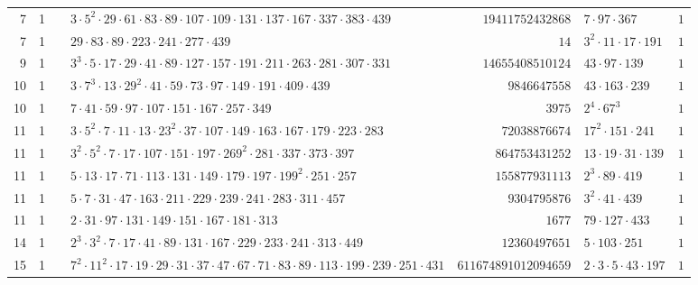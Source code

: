 \documentclass[a4paper,twoside,10pt]{report}
\renewcommand{\checkmark}{\text{\ding{51}}}
\newcommand{\cross}{\text{\ding{55}}}
\begin{document}
\begin{longtable}{rrcp{5cm}rp{5cm}r}
7 & 1 & \checkmark& $3 \cdot 5^{2} \cdot 29 \cdot 61 \cdot 83 \cdot 89 \cdot 107 \cdot 109 \cdot 131 \cdot 137 \cdot 167 \cdot 337 \cdot 383 \cdot 439$ & $19411752432868$ & $7 \cdot 97 \cdot 367$ & $1$\\
7 & 1 & \cross& $29 \cdot 83 \cdot 89 \cdot 223 \cdot 241 \cdot 277 \cdot 439$ & $14$ & $3^{2} \cdot 11 \cdot 17 \cdot 191$ & $1$\\
9 & 1 & \checkmark& $3^{3} \cdot 5 \cdot 17 \cdot 29 \cdot 41 \cdot 89 \cdot 127 \cdot 157 \cdot 191 \cdot 211 \cdot 263 \cdot 281 \cdot 307 \cdot 331$ & $14655408510124$ & $43 \cdot 97 \cdot 139$ & $1$\\
10 & 1 & \checkmark& $3 \cdot 7^{3} \cdot 13 \cdot 29^{2} \cdot 41 \cdot 59 \cdot 73 \cdot 97 \cdot 149 \cdot 191 \cdot 409 \cdot 439$ & $9846647558$ & $43 \cdot 163 \cdot 239$ & $1$\\
10 & 1 & \cross& $7 \cdot 41 \cdot 59 \cdot 97 \cdot 107 \cdot 151 \cdot 167 \cdot 257 \cdot 349$ & $3975$ & $2^{4} \cdot 67^{3}$ & $1$\\
11 & 1 & \checkmark& $3 \cdot 5^{2} \cdot 7 \cdot 11 \cdot 13 \cdot 23^{2} \cdot 37 \cdot 107 \cdot 149 \cdot 163 \cdot 167 \cdot 179 \cdot 223 \cdot 283$ & $72038876674$ & $17^{2} \cdot 151 \cdot 241$ & $1$\\
11 & 1 & \checkmark& $3^{2} \cdot 5^{2} \cdot 7 \cdot 17 \cdot 107 \cdot 151 \cdot 197 \cdot 269^{2} \cdot 281 \cdot 337 \cdot 373 \cdot 397$ & $864753431252$ & $13 \cdot 19 \cdot 31 \cdot 139$ & $1$\\
11 & 1 & \checkmark& $5 \cdot 13 \cdot 17 \cdot 71 \cdot 113 \cdot 131 \cdot 149 \cdot 179 \cdot 197 \cdot 199^{2} \cdot 251 \cdot 257$ & $155877931113$ & $2^{3} \cdot 89 \cdot 419$ & $1$\\
11 & 1 & \checkmark& $5 \cdot 7 \cdot 31 \cdot 47 \cdot 163 \cdot 211 \cdot 229 \cdot 239 \cdot 241 \cdot 283 \cdot 311 \cdot 457$ & $9304795876$ & $3^{2} \cdot 41 \cdot 439$ & $1$\\
11 & 1 & \cross& $2 \cdot 31 \cdot 97 \cdot 131 \cdot 149 \cdot 151 \cdot 167 \cdot 181 \cdot 313$ & $1677$ & $79 \cdot 127 \cdot 433$ & $1$\\
14 & 1 & \checkmark& $2^{3} \cdot 3^{2} \cdot 7 \cdot 17 \cdot 41 \cdot 89 \cdot 131 \cdot 167 \cdot 229 \cdot 233 \cdot 241 \cdot 313 \cdot 449$ & $12360497651$ & $5 \cdot 103 \cdot 251$ & $1$\\
15 & 1 & \checkmark& $7^{2} \cdot 11^{2} \cdot 17 \cdot 19 \cdot 29 \cdot 31 \cdot 37 \cdot 47 \cdot 67 \cdot 71 \cdot 83 \cdot 89 \cdot 113 \cdot 199 \cdot 239 \cdot 251 \cdot 431$ & $611674891012094659$ & $2 \cdot 3 \cdot 5 \cdot 43 \cdot 197$ & $1$\\

\end{longtable}
\end{document}
